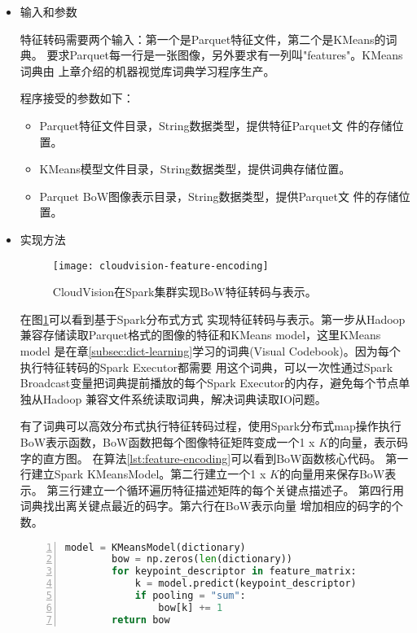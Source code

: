 \begin{itemize}
  \item 输入和参数 

        特征转码需要两个输入：第一个是Parquet特征文件，第二个是KMeans的词典。
        要求Parquet每一行是一张图像，另外要求有一列叫"features"。KMeans词典由
        上章介绍的机器视觉库词典学习程序生产。

        程序接受的参数如下：
        \begin{itemize}
          \item Parquet特征文件目录，String数据类型，提供特征Parquet文
                件的存储位置。
          \item KMeans模型文件目录，String数据类型，提供词典存储位置。
          \item Parquet BoW图像表示目录，String数据类型，提供Parquet文
                件的存储位置。
        \end{itemize}
  \item 实现方法

       \begin{figure}[h]
          \centering
            \texttt{[image: cloudvision-feature-encoding]}
          \caption{CloudVision在Spark集群实现BoW特征转码与表示。}
          \label{fig:cloudvision-feature-encoding}
        \end{figure}
        在图\ref{fig:cloudvision-feature-encoding}可以看到基于Spark分布式方式
        实现特征转码与表示。第一步从Hadoop兼容存储读取Parquet格式的图像的特征和KMeans model，这里KMeans model
        是在章\ref{subsec:dict-learning}学习的词典(Visual Codebook)。因为每个执行特征转码的Spark Executor都需要
        用这个词典，可以一次性通过Spark Broadcast变量把词典提前播放的每个Spark Executor的内存，避免每个节点单独从Hadoop
        兼容文件系统读取词典，解决词典读取IO问题。\cite{spark-programming-guide}

        有了词典可以高效分布式执行特征转码过程，使用Spark分布式map操作执行
        BoW表示函数，BoW函数把每个图像特征矩阵变成一个1 x $K$的向量，表示码字的直方图。
        在算法\ref{lst:feature-encoding}可以看到BoW函数核心代码。
        第一行建立Spark KMeansModel。第二行建立一个1 x $K$的向量用来保存BoW表示。
        第三行建立一个循环遍历特征描述矩阵的每个关键点描述子。
        第四行用词典找出离关键点最近的码字。第六行在BoW表示向量
        增加相应的码字的个数。
        \begin{minipage}{\textwidth}
        \begin{lstlisting}[language=Python,
                           basicstyle=\small,
                           numbers=left,
                           showstringspaces=false,
                           caption={BoW特征转码核心代码},
                           label={lst:feature-encoding}]
        model = KMeansModel(dictionary)
        bow = np.zeros(len(dictionary))
        for keypoint_descriptor in feature_matrix:
            k = model.predict(keypoint_descriptor)
            if pooling = "sum":
                bow[k] += 1
        return bow
        \end{lstlisting}
        \end{minipage}


\end{itemize}
